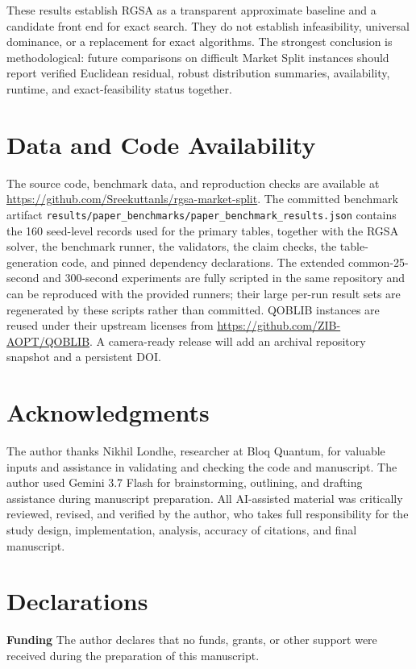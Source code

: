 \documentclass[11pt]{article}
\begin{document}
These results establish RGSA as a transparent approximate baseline and a candidate front end for exact search. They do not establish infeasibility, universal dominance, or a replacement for exact algorithms. The strongest conclusion is methodological: future comparisons on difficult Market Split instances should report verified Euclidean residual, robust distribution summaries, availability, runtime, and exact-feasibility status together.

\section*{Data and Code Availability}
The source code, benchmark data, and reproduction checks are available at \url{https://github.com/Sreekuttanls/rgsa-market-split}. The committed benchmark artifact \texttt{results/paper\_benchmarks/paper\_benchmark\_results.json} contains the 160 seed-level records used for the primary tables, together with the RGSA solver, the benchmark runner, the validators, the claim checks, the table-generation code, and pinned dependency declarations. The extended common-25-second and 300-second experiments are fully scripted in the same repository and can be reproduced with the provided runners; their large per-run result sets are regenerated by these scripts rather than committed. QOBLIB instances are reused under their upstream licenses from \url{https://github.com/ZIB-AOPT/QOBLIB}. A camera-ready release will add an archival repository snapshot and a persistent DOI.

\section*{Acknowledgments}
The author thanks Nikhil Londhe, researcher at Bloq Quantum, for valuable inputs and assistance in validating and checking the code and manuscript. The author used Gemini 3.7 Flash for brainstorming, outlining, and drafting assistance during manuscript preparation. All AI-assisted material was critically reviewed, revised, and verified by the author, who takes full responsibility for the study design, implementation, analysis, accuracy of citations, and final manuscript.

\section*{Declarations}
\textbf{Funding} The author declares that no funds, grants, or other support were received during the preparation of this manuscript.
\end{document}
